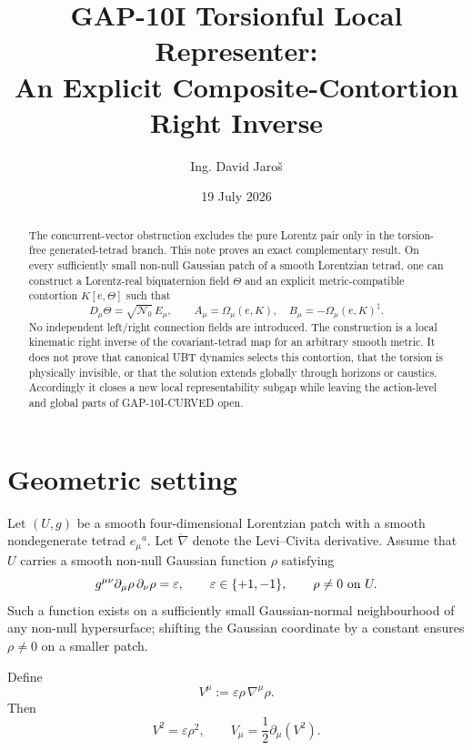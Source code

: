 \documentclass[12pt,a4paper]{article}
\title{GAP-10I Torsionful Local Representer:\\An Explicit Composite-Contortion Right Inverse}
\author{Ing. David Jaro\v{s}}
\date{19 July 2026}
\theoremstyle{remark}\newtheorem{remark}[definition]{Remark}
\newcommand{\LC}{\mathring\nabla}
\begin{document}
\maketitle
\UBTProvenanceNotice

\begin{abstract}
The concurrent-vector obstruction excludes the pure Lorentz pair only in the
torsion-free generated-tetrad branch.  This note proves an exact complementary
result.  On every sufficiently small non-null Gaussian patch of a smooth
Lorentzian tetrad, one can construct a Lorentz-real biquaternion field
$\Theta$ and an explicit metric-compatible contortion $K[e,\Theta]$ such that
\[
 D_\mu\Theta=\sqrt{\mathcal N_0}\,E_\mu,
 \qquad
 A_\mu=\Omega_\mu(e,K),\quad
 B_\mu=-\Omega_\mu(e,K)^\ddagger .
\]
No independent left/right connection fields are introduced.  The construction
is a local kinematic right inverse of the covariant-tetrad map for an arbitrary
smooth metric.  It does not prove that canonical UBT dynamics selects this
contortion, that the torsion is physically invisible, or that the solution
extends globally through horizons or caustics.  Accordingly it closes a new
local representability subgap while leaving the action-level and global parts
of GAP-10I-CURVED open.
\end{abstract}

\section{Geometric setting}
Let $(U,g)$ be a smooth four-dimensional Lorentzian patch with a smooth
nondegenerate tetrad $e_\mu{}^a$.  Let $\LC$ denote the Levi--Civita derivative.
Assume that $U$ carries a smooth non-null Gaussian function $\rho$ satisfying
\begin{equation}
 g^{\mu\nu}\partial_\mu\rho\,\partial_\nu\rho=\varepsilon,
 \qquad \varepsilon\in\{+1,-1\},
 \qquad \rho\ne0\ \hbox{on }U.
 \label{eq:eikonal}
\end{equation}
Such a function exists on a sufficiently small Gaussian-normal neighbourhood
of any non-null hypersurface; shifting the Gaussian coordinate by a constant
ensures $\rho\ne0$ on a smaller patch.

Define
\begin{equation}
 V^\mu:=\varepsilon\rho\,\nabla^\mu\rho.
 \label{eq:V-def}
\end{equation}
Then
\begin{equation}
 V^2=\varepsilon\rho^2,
 \qquad
 V_\mu=\frac12\partial_\mu(V^2).
 \label{eq:norm-gradient}
\end{equation}
\end{document}
